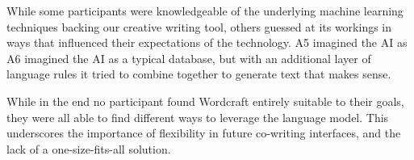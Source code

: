 
While some participants were knowledgeable of the underlying machine learning techniques backing our creative writing tool, others guessed at its workings in ways that influenced their expectations of the technology.
A5 imagined the AI as 
A6 imagined the AI as a typical database, but with an additional layer of language rules it tried to combine together to generate text that makes sense.

While in the end no participant found Wordcraft entirely suitable to their goals, they were all able to find different ways to leverage the language model.
This underscores the importance of flexibility in future co-writing interfaces, and the lack of a one-size-fits-all solution.







